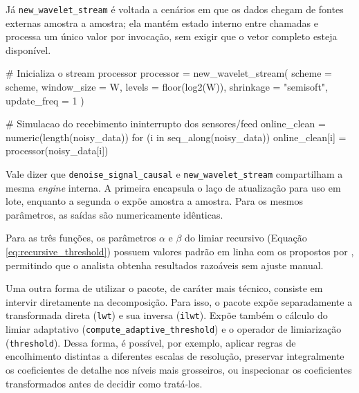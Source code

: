 Já \texttt{new\_wavelet\_stream} é voltada a cenários em que os dados chegam de fontes externas amostra a amostra; ela mantém estado interno entre chamadas e processa um único valor por invocação, sem exigir que o vetor completo esteja disponível.

\begin{codeblock}
# Inicializa o stream processor
processor = new_wavelet_stream(
  scheme = scheme,
  window_size = W,
  levels = floor(log2(W)),
  shrinkage = "semisoft",
  update_freq = 1
)

# Simulacao do recebimento ininterrupto dos sensores/feed
online_clean = numeric(length(noisy_data))
for (i in seq_along(noisy_data)) {
  online_clean[i] = processor(noisy_data[i])
}
\end{codeblock}

Vale dizer que \texttt{denoise\_signal\_causal} e \texttt{new\_wavelet\_stream} compartilham a mesma \emph{engine} interna. 
A primeira encapsula o laço de atualização para uso em lote, enquanto a segunda o expõe amostra a amostra. Para os mesmos parâmetros, as saídas são numericamente idênticas.

Para as três funções, os parâmetros \(\alpha\) e \(\beta\) do limiar recursivo (Equação \ref{eq:recursive_threshold}) possuem valores padrão em linha com os propostos por , permitindo que o analista obtenha resultados razoáveis sem ajuste manual.

Uma outra forma de utilizar o pacote, de caráter mais técnico, consiste em intervir diretamente na decomposição. 
Para isso, o pacote expõe separadamente a transformada direta (\texttt{lwt}) e sua inversa (\texttt{ilwt}). 
Expõe também o cálculo do limiar adaptativo (\texttt{compute\_adaptive\_threshold}) e o operador de limiarização (\texttt{threshold}). 
Dessa forma, é possível, por exemplo, aplicar regras de encolhimento distintas a diferentes escalas de resolução, preservar integralmente os coeficientes de detalhe nos níveis mais grosseiros, ou inspecionar os coeficientes transformados antes de decidir como tratá-los.

